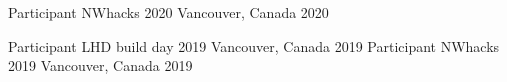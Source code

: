 



\begin{cvhonors}


\cvhonor
    {Participant} %
    {NWhacks 2020} %
    {Vancouver, Canada} %
    {2020} %

\cvhonor
    {Participant} %
    {LHD build day 2019} %
    {Vancouver, Canada} %
    {2019} %
  \cvhonor
    {Participant} %
    {NWhacks 2019} %
    {Vancouver, Canada} %
    {2019} %


\end{cvhonors}







